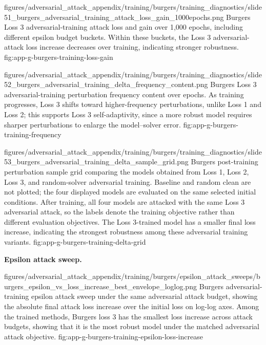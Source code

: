 \documentclass[letterpaper]{article} %
\begin{document}
\clearpage
\appendixtrainingfigportraitwide
  {figures/adversarial_attack_appendix/training/burgers/training_diagnostics/slide51_burgers_adversarial_training_attack_loss_gain_1000epochs.png}
  {Burgers Loss 3 adversarial-training attack loss and gain over 1,000 epochs,
  including different epsilon budget buckets. Within these buckets, the Loss 3
  adversarial-attack loss increase decreases over training, indicating stronger
  robustness.}
  {fig:app-g-burgers-training-loss-gain}

\appendixtrainingfigportraitwide
  {figures/adversarial_attack_appendix/training/burgers/training_diagnostics/slide52_burgers_adversarial_training_delta_frequency_content.png}
  {Burgers Loss 3 adversarial-training perturbation frequency content over
  epochs. As training progresses, Loss 3 shifts toward higher-frequency
  perturbations, unlike Loss 1 and Loss 2; this supports Loss 3 self-adaptivity,
  since a more robust model requires sharper perturbations to enlarge the
  model--solver error.}
  {fig:app-g-burgers-training-frequency}

\clearpage
\appendixattackfigportraitwide
  {figures/adversarial_attack_appendix/training/burgers/training_diagnostics/slide53_burgers_adversarial_training_delta_sample_grid.png}
  {Burgers post-training perturbation sample grid comparing the models obtained
  from Loss 1, Loss 2, Loss 3, and random-solver adversarial training. Baseline
  and random clean are not plotted; the four displayed models are evaluated on
  the same selected initial conditions. After training, all four models are
  attacked with the same Loss 3 adversarial attack, so the labels denote the
  training objective rather than different evaluation objectives. The Loss 3-trained
  model has a smaller final loss increase, indicating the strongest robustness
  among these adversarial training variants.}
  {fig:app-g-burgers-training-delta-grid}

\clearpage
\noindent\textbf{Epsilon attack sweep.}

\appendixattackfig
  {figures/adversarial_attack_appendix/training/burgers/epsilon_attack_sweeps/burgers_epsilon_vs_loss_increase_best_envelope_loglog.png}
  {Burgers adversarial-training epsilon attack sweep under the same adversarial
  attack budget, showing the absolute final attack loss increase over the
  initial loss on log-log axes. Among the trained methods, Burgers loss 3 has
  the smallest loss increase across attack budgets, showing that it is the most
  robust model under the matched adversarial attack objective.}
  {fig:app-g-burgers-training-epsilon-loss-increase}
\end{document}
